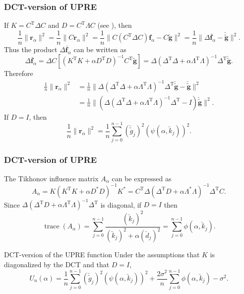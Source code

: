 \documentclass[t]{beamer}
\newcommand{\noiseSD}{\sigma}	%
\newcommand{\gnoise}{\widetilde{g}}	%
\newcommand{\gnoiseVec}{\widetilde{\mathbf{g}}}	%
\newcommand{\fVec}{\mathbf{f}}	%
\newcommand{\trans}{\mathrm{T}}	%
\newcommand{\ctrans}{*}	%
\DeclareMathOperator{\trace}{trace}		%
\newcommand{\dct}[1]{\breve{#1}}	%
\newcommand{\regparam}{\alpha}
\newcommand{\regf}{\fVec_{\regparam}}	%
\newcommand{\filt}{\phi}
\newcommand{\mfilt}{\psi}
\newcommand{\regres}{\mathbf{r}_{\regparam}}	%
\newcommand{\A}{A_{\regparam}}	%
\newcommand{\U}{U}	%
\begin{document}
\begin{frame}
\frametitle{DCT-version of UPRE}
If $K = C^\trans\Delta{C}$ and $D = C^\trans\Lambda{C}$ (see \cite{Strang1999}), then
\[\frac{1}{n}\|\regres\|^2 = \frac{1}{n}\|C\regres\|^2 = \frac{1}{n}\|C(C^\trans\Delta{C})\regf - C\gnoiseVec\|^2 = \frac{1}{n}\|\Delta\dct{\regf} - \dct{\gnoiseVec}\|^2.\]
Thus the product $\Delta\dct{\regf}$ can be written as
\[\Delta\dct{\regf} = \Delta{C}[(K^\trans{K} + \regparam{D^\trans}D)^{-1}C^\trans\gnoiseVec] = \Delta(\Delta^\trans{\Delta} + \regparam\Lambda^\trans{\Lambda})^{-1}\Delta^\trans\dct{\gnoiseVec}.\]
Therefore
\begin{align*}
\frac{1}{n}\|\regres\|^2 &= \frac{1}{n}\|\Delta(\Delta^\trans{\Delta} + \regparam\Lambda^\trans{\Lambda})^{-1}\Delta^\trans\dct{\gnoiseVec} - \dct{\gnoiseVec}\|^2 \\
&= \frac{1}{n}\|(\Delta(\Delta^\trans{\Delta} + \regparam\Lambda^\trans{\Lambda})^{-1}\Delta^\trans - I)\dct{\gnoiseVec}\|^2.
\end{align*}
If $D = I$, then
\[\frac{1}{n}\|\regres\|^2 = \frac{1}{n}\sum_{j=0}^{n-1}(\dct{\gnoise}_j)^2\left(\mfilt(\regparam,\dct{k}_j)\right)^2.\]
\end{frame}

\begin{frame}
\frametitle{DCT-version of UPRE}
The Tikhonov influence matrix $\A$ can be expressed as
\[\A = K(K^\trans{K} + \regparam{D^\ctrans}D)^{-1}K^\ctrans = C^\trans\Delta(\Delta^\trans{D} + \regparam\Lambda^\ctrans{\Lambda})^{-1}\Delta^\trans{C}.\]
Since $\Delta(\Delta^\trans{D} + \regparam\Lambda^\trans{\Lambda})^{-1}\Delta^\trans$ is diagonal, if $D = I$ then
\[\trace(\A) = \sum_{j = 0}^{n-1} \frac{(\dct{k}_j)^2}{(\dct{k}_j)^2 + \regparam(\dct{d}_j)^2} = \sum_{j = 0}^{n-1} \filt(\regparam,\dct{k}_j).\]
\begin{block}{DCT-version of the UPRE function}
Under the assumptions that $K$ is diagonalized by the DCT and that $D = I$,
\[\U_n(\regparam) = \frac{1}{n}\sum_{j = 0}^{n-1} (\dct{\gnoise}_j)^2(\mfilt(\regparam,\dct{k}_j))^2 + \frac{2\noiseSD^2}{n}\sum_{j = 0}^{n-1} \filt(\regparam,\dct{k}_j) - \noiseSD^2.\]
\end{block}
\end{frame}
\end{document}
